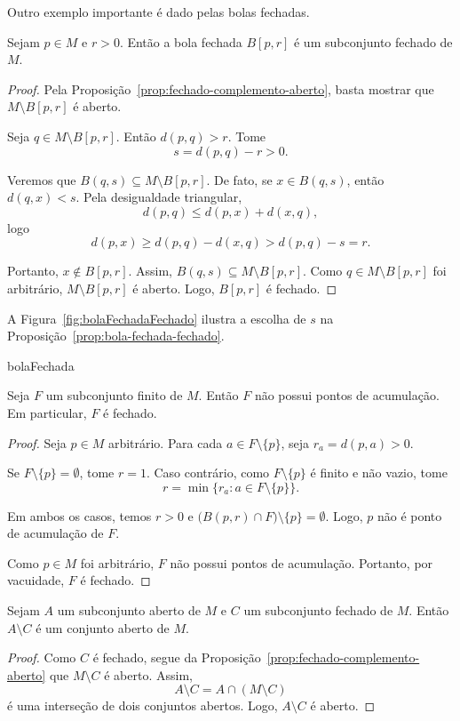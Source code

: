 Outro exemplo importante é dado pelas bolas fechadas.

\begin{proposition}\label{prop:bola-fechada-fechado}
    Sejam $p\in M$ e $r>0$.
    Então a bola fechada $B[p,r]$ é um subconjunto fechado de $M$.
\end{proposition}
\begin{proof}
    Pela Proposição~\ref{prop:fechado-complemento-aberto}, basta mostrar que $M\setminus B[p,r]$ é aberto.

    Seja $q\in M\setminus B[p,r]$.
    Então $d(p,q)>r$.
    Tome
    \[
        s=d(p,q)-r>0.
    \]

    Veremos que $B(q,s)\subseteq M\setminus B[p,r]$.
    De fato, se $x\in B(q,s)$, então $d(q,x)<s$.
    Pela desigualdade triangular,
    \[
        d(p,q)\leq d(p,x)+d(x,q),
    \]
    logo
    \[
        d(p,x)\geq d(p,q)-d(x,q)>d(p,q)-s=r.
    \]

    Portanto, $x\notin B[p,r]$.
    Assim, $B(q,s)\subseteq M\setminus B[p,r]$.
    Como $q\in M\setminus B[p,r]$ foi arbitrário, $M\setminus B[p,r]$ é aberto.
    Logo, $B[p,r]$ é fechado.
\end{proof}

A Figura~\ref{fig:bolaFechadaFechado} ilustra a escolha de $s$ na Proposição~\ref{prop:bola-fechada-fechado}.

{bolaFechada}

\begin{proposition}
    Seja $F$ um subconjunto finito de $M$.
    Então $F$ não possui pontos de acumulação.
    Em particular, $F$ é fechado.
\end{proposition}
\begin{proof}
    Seja $p\in M$ arbitrário.
    Para cada $a\in F\setminus\{p\}$, seja $r_a=d(p,a)>0$.

    Se $F\setminus\{p\}=\emptyset$, tome $r=1$.
    Caso contrário, como $F\setminus\{p\}$ é finito e não vazio, tome
    \[
        r=\min\{r_a:a\in F\setminus\{p\}\}.
    \]

    Em ambos os casos, temos $r>0$ e $\bigl(B(p,r)\cap F\bigr)\setminus\{p\}=\emptyset$.
    Logo, $p$ não é ponto de acumulação de $F$.

    Como $p\in M$ foi arbitrário, $F$ não possui pontos de acumulação.
    Portanto, por vacuidade, $F$ é fechado.
\end{proof}

\begin{proposition}
    Sejam $A$ um subconjunto aberto de $M$ e $C$ um subconjunto fechado de $M$.
    Então $A\setminus C$ é um conjunto aberto de $M$.
\end{proposition}
\begin{proof}
    Como $C$ é fechado, segue da Proposição~\ref{prop:fechado-complemento-aberto} que $M\setminus C$ é aberto.
    Assim,
    \[
        A\setminus C = A\cap(M\setminus C)
    \]
    é uma interseção de dois conjuntos abertos.
    Logo, $A\setminus C$ é aberto.
\end{proof}

